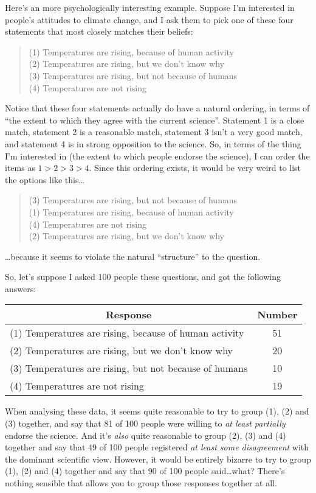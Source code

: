 Here's an more psychologically interesting example. Suppose I'm interested in people's attitudes to climate change, and I ask them to pick one of these four statements that most closely matches their beliefs:
\begin{quote}
(1) Temperatures are rising, because of human activity \\
(2) Temperatures are rising, but we don't know why \\
(3) Temperatures are rising, but not because of humans \\
(4) Temperatures are not rising
\end{quote}
Notice that these four statements actually do have a natural ordering, in terms of ``the extent to which they agree with the current science''. Statement 1 is a close match, statement 2 is a reasonable match, statement 3 isn't a very good match, and statement 4 is in strong opposition to the science. So, in terms of the thing I'm interested in (the extent to which people endorse the science), I can order the items as $1 > 2 > 3 > 4$. Since this ordering exists,  it would be very weird to list the options like this\ldots
\begin{quote}
(3) Temperatures are rising, but not because of humans \\
(1) Temperatures are rising, because of human activity \\
(4) Temperatures are not rising\\
(2) Temperatures are rising, but we don't know why 
\end{quote}
\ldots because it seems to violate the natural ``structure'' to the question. 

So, let's suppose I asked 100 people these questions, and got the following answers:

 \vspace*{6pt}
\begin{tabular}{lc}
\multicolumn{1}{c}{Response} & Number \\ \hline
(1) Temperatures are rising, because of human activity & 51\\
(2) Temperatures are rising, but we don't know why  & 20 \\
(3) Temperatures are rising, but not because of humans & 10 \\
(4) Temperatures are not rising & 19 \\ \hline
\end{tabular}
 \vspace*{6pt}

\noindent
When analysing these data, it seems quite reasonable to try to group (1), (2) and (3) together, and say that 81 of 100 people were willing to {\it at least partially} endorse the science. And it's {\it also} quite reasonable to group (2), (3) and (4) together and say that 49 of 100 people registered {\it at least some disagreement} with the dominant scientific view. However, it would be entirely bizarre to try to group (1), (2) and (4) together and say that 90 of 100 people said\ldots what? There's nothing sensible that allows you to group those responses together at all.

